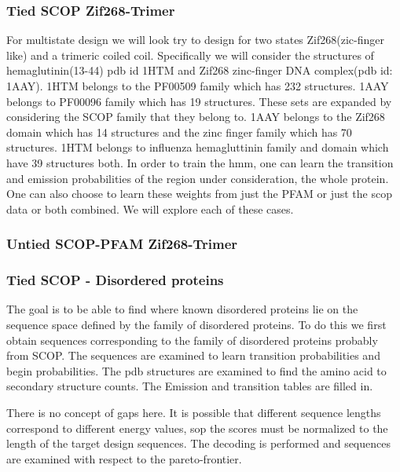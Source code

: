 \documentclass{article}
\begin{document}
\subsubsection{Tied SCOP Zif268-Trimer}
\label{exp:tied_scop_multistate}
For multistate design we will look try to design for two states Zif268(zic-finger like) and a trimeric coiled coil. Specifically we will consider the structures of hemaglutinin(13-44) pdb id 1HTM and Zif268 zinc-finger DNA complex(pdb id: 1AAY). 1HTM belongs to the PF00509 family which has 232 structures. 1AAY belongs to PF00096 family which has 19 structures. These sets are expanded by considering the SCOP family that they belong to. 1AAY belongs to the Zif268 domain which has 14 structures and the zinc finger family which has 70 structures. 1HTM belongs to influenza hemagluttinin family and domain which have 39 structures both. In order to train the hmm, one can learn the transition and emission probabilities of the region under consideration, the whole protein. One can also choose to learn these weights from just the PFAM or just the scop data or both combined. We will explore each of these cases. 


\subsubsection{Untied SCOP-PFAM Zif268-Trimer}
\label{exp:untied_scop_zif}


\subsubsection{Tied SCOP - Disordered proteins}
\label{exp:tied_scop_disordered}
The goal is to be able to find where known disordered proteins lie on the sequence space defined by the family of disordered proteins. To do this we first obtain sequences corresponding to the family of disordered   proteins probably from SCOP. The sequences are examined to learn transition probabilities and begin probabilities. The pdb structures are examined to find the amino acid to secondary structure counts. The Emission and transition tables are filled in. 

There is no concept of gaps here. It is possible that different sequence lengths correspond to different energy values, sop the scores must be normalized to the length of the target design sequences. The decoding is performed and sequences are examined with respect to the pareto-frontier. 
\end{document}
